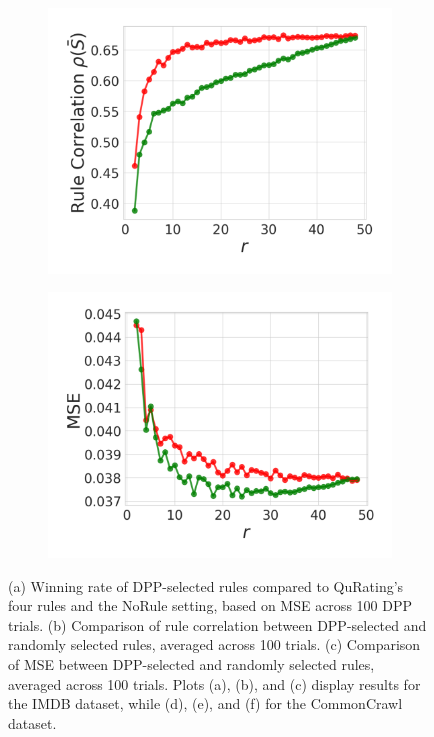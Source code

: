 \documentclass{article}
\begin{document}
\begin{figure}[h]
\begin{subfigure}{0.297\textwidth}
  \includegraphics[width=1.0\linewidth]{figures/EvalA_CommonCrawl_Pairwise_dpp_vs_random_RC.pdf}
  \caption{}
  \label{fig:EvalA_CommonCrawl_Pairwise_dpp_vs_random_RC}
\end{subfigure}
\begin{subfigure}{0.3\textwidth}
  \centering
  \includegraphics[width=1.0\linewidth]{figures/EvalA_CommonCrawl_Pairwise_dpp_vs_random_MSE.pdf}
  \caption{}
  \label{fig:EvalA_CommonCrawl_Pairwise_dpp_vs_random_MSE}
\end{subfigure}
\caption{(a) Winning rate of DPP-selected rules compared to QuRating’s four rules and the NoRule setting, based on MSE across 100 DPP trials. (b) Comparison of rule correlation between DPP-selected and randomly selected rules, averaged across 100 trials. (c) Comparison of MSE between DPP-selected and randomly selected rules, averaged across 100 trials. Plots (a), (b), and (c) display results for the IMDB dataset, while (d), (e), and (f) for the CommonCrawl dataset.}
\label{fig:test}
\end{figure}
\end{document}
